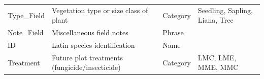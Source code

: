 \documentclass[
  12pt,
]{article}
\begin{document}
\begin{longtable}[]{@{}llll@{}}
\begin{minipage}[t]{0.13\columnwidth}\raggedright
Type\_Field\strut
\end{minipage} & \begin{minipage}[t]{0.37\columnwidth}\raggedright
Vegetation type or size class of plant\strut
\end{minipage} & \begin{minipage}[t]{0.19\columnwidth}\raggedright
Category\strut
\end{minipage} & \begin{minipage}[t]{0.20\columnwidth}\raggedright
Seedling, Sapling, Liana, Tree\strut
\end{minipage}\tabularnewline
\begin{minipage}[t]{0.13\columnwidth}\raggedright
Note\_Field\strut
\end{minipage} & \begin{minipage}[t]{0.37\columnwidth}\raggedright
Miscellaneous field notes\strut
\end{minipage} & \begin{minipage}[t]{0.19\columnwidth}\raggedright
Phrase\strut
\end{minipage} & \begin{minipage}[t]{0.20\columnwidth}\raggedright
\strut
\end{minipage}\tabularnewline
\begin{minipage}[t]{0.13\columnwidth}\raggedright
ID\strut
\end{minipage} & \begin{minipage}[t]{0.37\columnwidth}\raggedright
Latin species identification\strut
\end{minipage} & \begin{minipage}[t]{0.19\columnwidth}\raggedright
Name\strut
\end{minipage} & \begin{minipage}[t]{0.20\columnwidth}\raggedright
\strut
\end{minipage}\tabularnewline
\begin{minipage}[t]{0.13\columnwidth}\raggedright
Treatment\strut
\end{minipage} & \begin{minipage}[t]{0.37\columnwidth}\raggedright
Future plot treatments (fungicide/insecticide)\strut
\end{minipage} & \begin{minipage}[t]{0.19\columnwidth}\raggedright
Category\strut
\end{minipage} & \begin{minipage}[t]{0.20\columnwidth}\raggedright
LMC, LME, MME, MMC\strut
\end{minipage}\tabularnewline
\bottomrule
\end{longtable}
\end{document}
